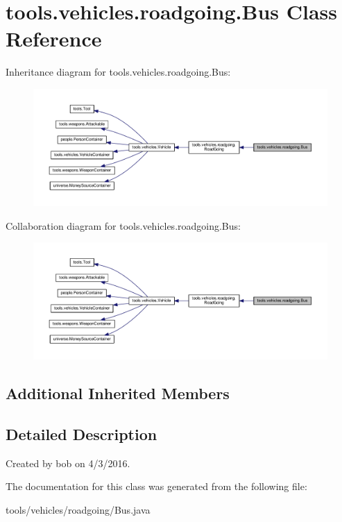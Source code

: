 \hypertarget{classtools_1_1vehicles_1_1roadgoing_1_1_bus}{}\section{tools.\+vehicles.\+roadgoing.\+Bus Class Reference}
\label{classtools_1_1vehicles_1_1roadgoing_1_1_bus}


Inheritance diagram for tools.\+vehicles.\+roadgoing.\+Bus\+:\nopagebreak
\begin{figure}[H]
\begin{center}
\leavevmode
\includegraphics[width=350pt]{classtools_1_1vehicles_1_1roadgoing_1_1_bus__inherit__graph}
\end{center}
\end{figure}


Collaboration diagram for tools.\+vehicles.\+roadgoing.\+Bus\+:\nopagebreak
\begin{figure}[H]
\begin{center}
\leavevmode
\includegraphics[width=350pt]{classtools_1_1vehicles_1_1roadgoing_1_1_bus__coll__graph}
\end{center}
\end{figure}
\subsection*{Additional Inherited Members}


\subsection{Detailed Description}
Created by bob on 4/3/2016. 

The documentation for this class was generated from the following file\+:\begin{DoxyCompactItemize}
\item 
tools/vehicles/roadgoing/Bus.\+java\end{DoxyCompactItemize}
